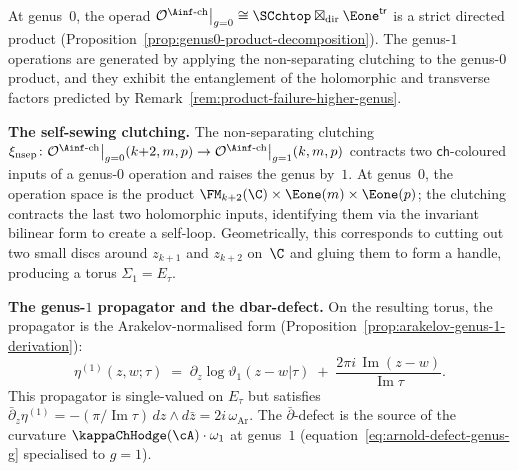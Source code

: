\begin{construction}
\label{constr:genus1-ainf-chiral-operations}
At genus~$0$, the operad
$\mathcal{O}^{\Ainf\text{-ch}}\big|_{g=0}
\cong \SCchtop\boxtimes_{\mathrm{dir}}\Eone^{\mathsf{tr}}$
is a strict directed product
(Proposition~\ref{prop:genus0-product-decomposition}).
The genus-$1$ operations are generated by applying the
non-separating clutching to the genus-$0$ product, and
they exhibit the entanglement of the holomorphic and
transverse factors predicted by
Remark~\ref{rem:product-failure-higher-genus}.

\medskip\noindent
\textbf{The self-sewing clutching.}
The non-separating clutching
$\xi_{\mathrm{nsep}} \colon
\mathcal{O}^{\Ainf\text{-ch}}\big|_{g=0}
(k{+}2,m,p) \to
\mathcal{O}^{\Ainf\text{-ch}}\big|_{g=1}(k,m,p)$
contracts two $\mathsf{ch}$-coloured inputs of a genus-$0$
operation and raises the genus by~$1$.
At genus~$0$, the operation space is the product
$\FM_{k+2}(\C) \times \Eone(m) \times \Eone(p)$;
the clutching contracts the last two holomorphic inputs,
identifying them via the invariant bilinear form to create
a self-loop.
Geometrically, this corresponds to cutting out
two small discs around $z_{k+1}$ and $z_{k+2}$ on~$\C$ and
gluing them to form a handle, producing a torus
$\Sigma_1 = E_\tau$.

\medskip\noindent
\textbf{The genus-$1$ propagator and the dbar-defect.}
On the resulting torus, the propagator is the
Arakelov-normalised form
(Proposition~\ref{prop:arakelov-genus-1-derivation}):
\[
 \eta^{(1)}(z,w;\tau)
 \;=\;
 \partial_z \log\vartheta_1(z{-}w|\tau)
 \;+\;
 \frac{2\pi i\, \operatorname{Im}(z{-}w)}
 {\operatorname{Im}\tau}.
\]
This propagator is single-valued on $E_\tau$ but
satisfies $\bar\partial_z \eta^{(1)} = -(\pi/\operatorname{Im}\tau)
\,dz \wedge d\bar z = 2i\,\omega_{\mathrm{Ar}}$.
The $\bar\partial$-defect is the source of the curvature
$\kappaChHodge(\cA) \cdot \omega_1$ at genus~$1$
(equation~\eqref{eq:arnold-defect-genus-g} specialised
to $g=1$).


\end{construction}
